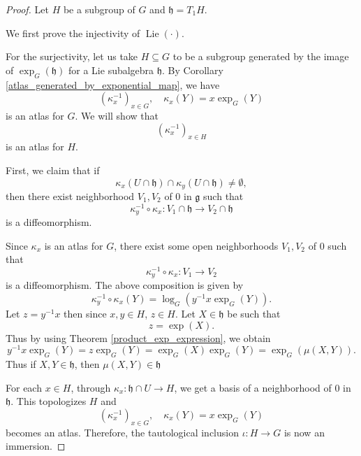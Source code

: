 \documentclass{article}
\numberwithin{equation}{section}
\DeclareMathOperator{\Lie}{Lie}
\begin{document}
\begin{proof}
Let $H$ be a subgroup of $G$ and $\mathfrak{h}=T_1H$.\\
\par We first prove the injectivity of $\Lie(\cdot)$.\\
\par For the surjectivity, let us take $H\subseteq G$ to be a subgroup generated by the image of $\exp_G(\mathfrak{h})$ for a Lie subalgebra $\mathfrak{h}$. By Corollary \ref{atlas_generated_by_exponential_map}, we have
\begin{equation*}
(\kappa_x^{-1})_{x\in G},\quad \kappa_x(Y)=x\exp_G(Y)
\end{equation*}
is an atlas for $G$. We will show that
\begin{equation*}
(\kappa_x^{-1})_{x\in H}
\end{equation*}
is an atlas for $H$.\\
\par First, we claim that if 
\begin{equation*}
\kappa_x(U\cap\mathfrak{h})\cap\kappa_y(U\cap\mathfrak{h})\not=\emptyset,
\end{equation*}
then there exist neighborhood $V_1,V_2$ of $0$ in $\mathfrak{g}$ such that
\begin{equation*}
\kappa_y^{-1}\circ\kappa_x:V_1\cap\mathfrak{h}\to V_2\cap\mathfrak{h}
\end{equation*}
is a diffeomorphism.\\
\par Since $\kappa_x$ is an atlas for $G$, there exist some open neighborhoods $V_1,V_2$ of $0$ such that
\begin{equation*}
\kappa_y^{-1}\circ\kappa_x:V_1\to V_2
\end{equation*}
is a diffeomorphism. The above composition is given by
\begin{equation*}
\kappa_y^{-1}\circ\kappa_x(Y) = \log_G(y^{-1}x\exp_G(Y)).
\end{equation*}
Let $z=y^{-1}x$ then since $x,y\in H$, $z\in H$. Let $X\in\mathfrak{h}$ be such that
\begin{equation*}
z = \exp(X). %
\end{equation*}
Thus by using Theorem \ref{product_exp_expression}, we obtain
\begin{equation*}
y^{-1}x\exp_G(Y) = z\exp_G(Y)=\exp_G(X)\exp_G(Y)=\exp_G(\mu(X,Y)).
\end{equation*}
Thus if $X,Y\in \mathfrak{h}$, then $\mu(X,Y)\in\mathfrak{h}$\\%
\par For each $x\in H$, through $\kappa_x:\mathfrak{h}\cap U\to H$, we get a basis of a neighborhood of $0$ in $\mathfrak{h}$. This topologizes $H$ and 
\begin{equation*}
(\kappa_x^{-1})_{x\in G},\quad \kappa_x(Y)=x\exp_G(Y)
\end{equation*}
becomes an atlas. Therefore, the tautological inclusion $\iota:H\to G$ is now an immersion.
\end{proof}
\end{document}
